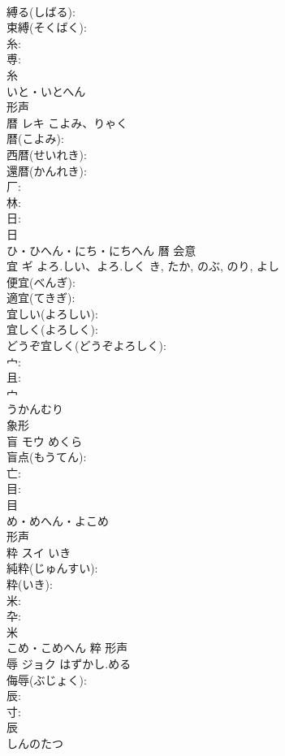 \documentclass[8pt]{extreport}
\begin{document}
\begin{CJK}{UTF8}{min}
\\	縛る(しばる): 
\\	束縛(そくばく): 
\\	糸: 
\\	尃: 
\\	糸	
\\	いと・いとへん	
\\	形声 
\\	暦	レキ	こよみ、りゃく		
\\	暦(こよみ): 
\\	西暦(せいれき): 
\\	還暦(かんれき): 
\\	厂: 
\\	林: 
\\	日: 
\\	日	
\\	ひ・ひへん・にち・にちへん	曆	会意 
\\	宜	ギ	よろ.しい、よろ.しく	き, たか, のぶ, のり, よし	
\\	便宜(べんぎ): 
\\	適宜(てきぎ): 
\\	宜しい(よろしい): 
\\	宜しく(よろしく): 
\\	どうぞ宜しく(どうぞよろしく): 
\\	宀: 
\\	且: 
\\	宀	
\\	うかんむり	
\\	象形 
\\	盲	モウ	めくら		
\\	盲点(もうてん): 
\\	亡: 
\\	目: 
\\	目	
\\	め・めへん・よこめ	
\\	形声 
\\	粋	スイ	いき		
\\	純粋(じゅんすい): 
\\	粋(いき): 
\\	米: 
\\	卆: 
\\	米	
\\	こめ・こめへん	粹	形声 
\\	辱	ジョク	はずかし.める		
\\	侮辱(ぶじょく): 
\\	辰: 
\\	寸: 
\\	辰	
\\	しんのたつ	

\end{CJK}
\end{document}

